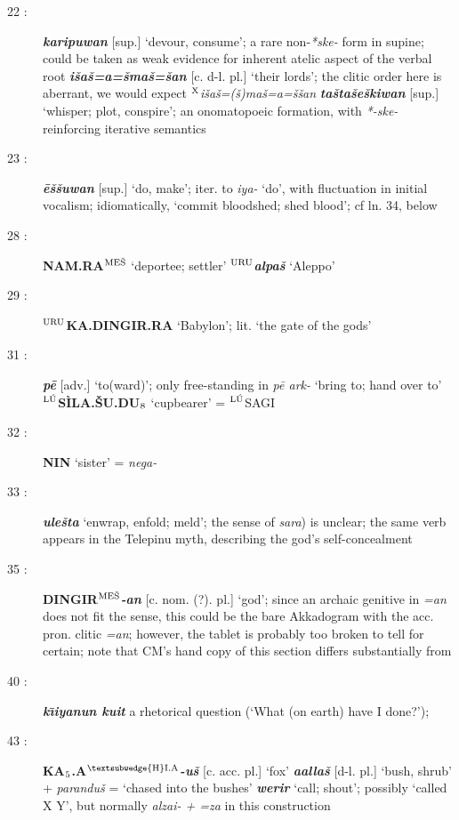 \documentclass[10pt]{article}
\newcommand{\supersc}[1]{$^{\textrm{\scriptsize{#1}}}$}  	%
\newcommand{\subsc}[1]{$_{\textrm{\scriptsize{#1}}}$}	%
\newcommand{\bit}[1]{\textbf{\textit{#1}}}				%
\newcommand{\p}[1]{{\tiny[{#1}]}}					%
\newcommand{\I}{\={\i}}									%
\newcommand{\hith}{\textsubwedge{h}}
\newcommand{\Hith}{\textsubwedge{H}}
\newcommand{\hpl}{\supersc{{\Hith}I.A}}
\newcommand{\man}{\supersc{L\'U}}
\newcommand{\mpl}{\supersc{ME\v{S}}}
\newcommand{\city}{\supersc{URU}}
\renewcommand{\.}[1]{\textsubdot{#1}}
\begin{document}
\begin{description}
\item[22 :] \bit{karipuwan} \p{sup.} `devour, consume'; a rare non-\textit{*ske-} form in supine; could be taken as weak evidence for inherent atelic aspect of the verbal root \bit{i\v{s}{\hith}a\v{s}=a=\v{s}ma\v{s}=\v{s}an} \p{c. d-l. pl.} `their lords'; the clitic order here is aberrant, we would expect \supersc{X}\textit{i\v{s}{\hith}a\v{s}=(\v{s})ma\v{s}=a=\v{s}\v{s}an} \bit{ta\v{s}ta\v{s}e\v{s}kiwan} \p{sup.} `whisper; plot, conspire'; an onomatopoeic formation, with \textit{*-ske-} reinforcing iterative semantics

\item[23 :] \bit{\=e\v{s}\v{s}uwan} \p{sup.} `do, make'; iter. to \textit{iya-} `do', with fluctuation in initial vocalism; idiomatically, `commit bloodshed; shed blood'; cf ln. 34, below

\item[28 :] \textbf{NAM.RA{\mpl}} `deportee; settler' \textbf{\city}\bit{{\Hith}alpa\v{s}} `Aleppo'

\item[29 :] \textbf{{\city}KA.DINGIR.RA} `Babylon'; lit. `the gate of the gods'

\item[31 :] \bit{p\=e} \p{adv.} `to(ward)'; only free-standing in \textit{p\=e {\hith}ark-} `bring to; hand over to' \textbf{{\man}S\`ILA.\v{S}U.DU\subsc{8}} `cupbearer' = {\man}SAGI

\item[32 :] \textbf{NIN} `sister' = \textit{nega-}

\item[33 :] \bit{ule\v{s}ta} `enwrap, enfold; meld'; the sense of \textit{sara}) is unclear; the same verb appears in the Telepinu myth, describing the god's self-concealment

\item[35 :] \textbf{DINGIR{\mpl}}\bit{-an} \p{c. nom. (?). pl.} `god'; since an archaic genitive in \textit{=an} does not fit the sense, this could be the bare Akkadogram with the acc. pron. clitic \textit{=an}; however, the tablet is probably too broken to tell for certain; note that CM's hand copy of this section differs substantially from \citet{hoffmann1984telepinu}

\item[40 :] \bit{k\I iyanun kuit} a rhetorical question (`What (on earth) have I done?');

\item[43 :] \textbf{KA\subsc{5}.A{\hpl}}\bit{-u\v{s}} \p{c. acc. pl.} `fox' \bit{{\hith}a{\hith\hith}alla\v{s}} \p{d-l. pl.} `bush, shrub' + \textit{par{\hith}andu\v{s}} = `chased into the bushes' \bit{werir} `call; shout'; possibly `called X Y', but normally \textit{{\hith}alzai- + =za} in this construction


\end{description}
\end{document}
